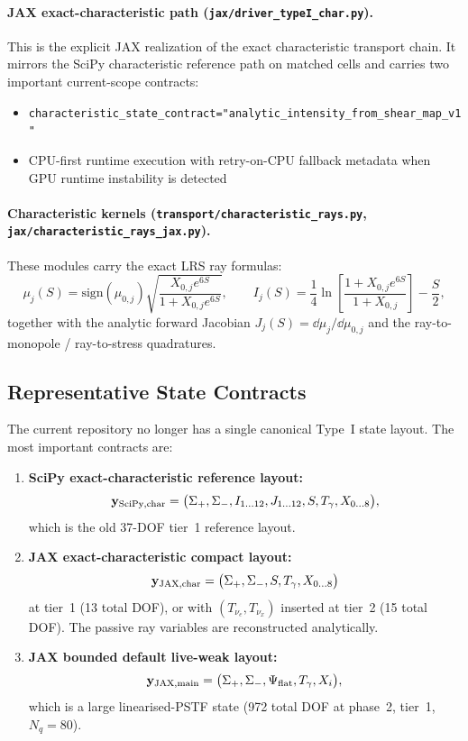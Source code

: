 \paragraph{JAX exact-characteristic path (\texttt{jax/driver\_typeI\_char.py}).}
This is the explicit JAX realization of the exact characteristic transport chain.  It mirrors the SciPy characteristic reference path on matched cells and carries two important current-scope contracts:
\begin{itemize}
\item \texttt{characteristic\_state\_contract="analytic\_intensity\_from\_shear\_map\_v1"}
\item CPU-first runtime execution with retry-on-CPU fallback metadata when GPU runtime instability is detected
\end{itemize}

\paragraph{Characteristic kernels (\texttt{transport/characteristic\_rays.py}, \texttt{jax/characteristic\_rays\_jax.py}).}
These modules carry the exact LRS ray formulas:
\begin{equation}
\mu_j(S)=\mathrm{sign}(\mu_{0,j})\sqrt{\frac{X_{0,j}e^{6S}}{1+X_{0,j}e^{6S}}},
\qquad
I_j(S)=\frac{1}{4}\ln\!\left[\frac{1+X_{0,j}e^{6S}}{1+X_{0,j}}\right]-\frac{S}{2},
\end{equation}
together with the analytic forward Jacobian $J_j(S)=\dd\mu_j/\dd\mu_{0,j}$ and the ray-to-monopole / ray-to-stress quadratures.

\subsection{Representative State Contracts}

The current repository no longer has a single canonical Type~I state layout.  The most important contracts are:
\begin{enumerate}
\item \textbf{SciPy exact-characteristic reference layout:}
\begin{equation}
\mathbf y_{\rm SciPy,char}
= \bigl(\Sigma_+,\Sigma_-,I_{1\ldots12},J_{1\ldots12},S,T_\gamma,X_{0\ldots8}\bigr),
\end{equation}
which is the old 37-DOF tier~1 reference layout.
\item \textbf{JAX exact-characteristic compact layout:}
\begin{equation}
\mathbf y_{\rm JAX,char}
= \bigl(\Sigma_+,\Sigma_-,S,T_\gamma,X_{0\ldots8}\bigr)
\end{equation}
at tier~1 (13 total DOF), or with $(T_{\nu_e},T_{\nu_x})$ inserted at tier~2 (15 total DOF).  The passive ray variables are reconstructed analytically.
\item \textbf{JAX bounded default live-weak layout:}
\begin{equation}
\mathbf y_{\rm JAX,main}
= \bigl(\Sigma_+,\Sigma_-,\Psi_{\rm flat},T_\gamma,X_i\bigr),
\end{equation}
which is a large linearised-PSTF state (972 total DOF at phase~2, tier~1, $N_q=80$).
\end{enumerate}

